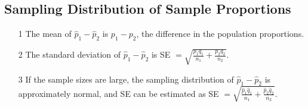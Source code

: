 \documentclass[12pt, letterpaper]{article}
\begin{document}
        \subsection{Sampling Distribution of Sample Proportions}
            \begin{mdframed}[leftmargin=0.5cm, rightmargin=0.5cm]
                \begin{itemize}
                    \item[1] The mean of $\hat{p}_1 - \hat{p}_2$ is $p_1 - p_2$, the difference in the population proportions.
                    \item[2] The standard deviation of $\hat{p}_1 - \hat{p}_2$ is SE $= \sqrt{\frac{p_1q_1}{n_1} + \frac{p_2q_2}{n_2}}$.
                    \item[3] If the sample sizes are large, the sampling distribution of $\hat{p}_1 - \hat{p}_2$ is approximately normal, and SE can be estimated as SE $= \sqrt{\frac{\hat{p}_1\hat{q}_1}{n_1} + \frac{\hat{p}_2\hat{q}_2}{n_2}}$.
                \end{itemize}
            \end{mdframed}
\end{document}
